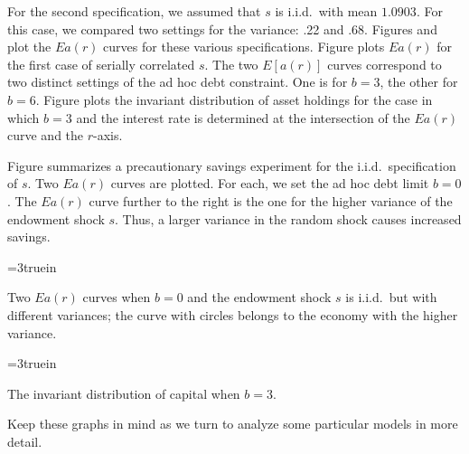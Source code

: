  For the second specification, we assumed that $s$ is i.i.d.\ with
mean $1.0903$. For this case, we compared two settings for
the variance: .22 and .68.
Figures  %
 and
 plot the $Ea(r)$ curves for these various
specifications.
  Figure  %
  plots $E a(r)$ for the first case of serially
correlated $s$.  The two $E [a(r)]$ curves correspond to
two distinct settings of the ad hoc debt constraint.
One is for $b=3$, the other for $b=6$.
Figure  %
plots the invariant distribution of asset holdings
for the case in which $b=3$ and  the interest rate is determined at the
intersection of the $Ea(r)$ curve and the $r$-axis.

  Figure  %
   summarizes a precautionary savings experiment for
the i.i.d.\ specification of $s$.  Two $E a(r)$ curves are
plotted. For each, we set the ad hoc debt limit $b=0$.  The
$E a(r)$ curve further to the right is the one for the higher
variance of the endowment shock $s$.  Thus, a larger variance in
the random shock causes increased savings.







\centerline{\epsfxsize=3truein}
\caption{Two $E a(r)$ curves when $b=0$ and the endowment shock $s$ is i.i.d.\
but with different variances; the curve with circles belongs to the economy with
the higher variance.}
\endfigure

\centerline{\epsfxsize=3truein}
\caption{The invariant distribution of capital when $b=3$.}
\endfigure

 Keep these graphs in mind as we turn to analyze
some particular models in more detail.



